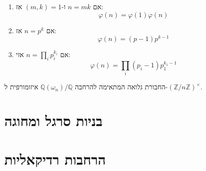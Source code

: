 \documentclass{tstextbook}
\begin{document}
\begin{corollary}
  \begin{enumerate}
    \item אם \(n=mk\) ו-\((m,k)=1\) אז: 
$$\varphi(n)=\varphi(1)\varphi(n)$$


    \item אם \(n=p^k\) אז: 
$$\varphi(n)=(p-1)p^{k-1}$$


    \item אם \(n=\prod_{i}p_{i}^{k_{i}}\) אזי: 
$$\varphi (n)= \prod_{i}(p_{i}-1)p_{1}^{k_{1}-1}$$


  \end{enumerate}
\end{corollary}
\begin{theorem}
החבורת גלואה המתאימה להרחבה \(\mathbb{Q}\left( \omega_{n} \right) / \mathbb{Q}\) איזומורפית ל-\(\left( \mathbb{Z} / n\mathbb{Z} \right)^\times\).

\end{theorem}
\section{בניות סרגל ומחוגה}

\section{הרחבות רדיקאליות}
\end{document}
